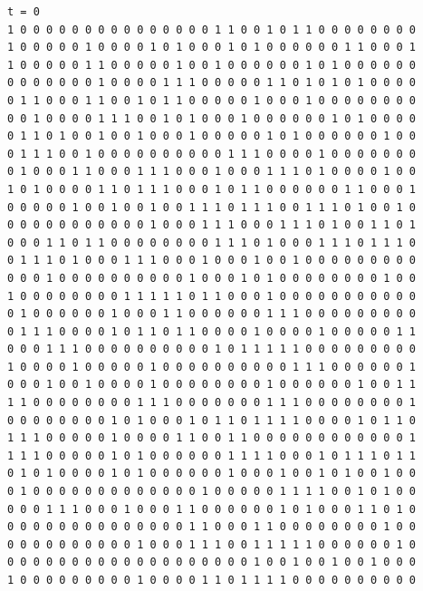 \documentclass[a4paper,12pt]{article}
\begin{document}
\begin{verbatim}
t = 0
1 0 0 0 0 0 0 0 0 0 0 0 0 0 0 0 1 1 0 0 1 0 1 1 0 0 0 0 0 0 0 0 
1 0 0 0 0 0 1 0 0 0 0 1 0 1 0 0 0 1 0 1 0 0 0 0 0 0 1 1 0 0 0 1 
1 0 0 0 0 0 1 1 0 0 0 0 0 1 0 0 1 0 0 0 0 0 0 1 0 1 0 0 0 0 0 0 
0 0 0 0 0 0 0 1 0 0 0 0 1 1 1 0 0 0 0 0 1 1 0 1 0 1 0 1 0 0 0 0 
0 1 1 0 0 0 1 1 0 0 1 0 1 1 0 0 0 0 0 1 0 0 0 1 0 0 0 0 0 0 0 0 
0 0 1 0 0 0 0 1 1 1 0 0 1 0 1 0 0 0 1 0 0 0 0 0 0 1 0 1 0 0 0 0 
0 1 1 0 1 0 0 1 0 0 1 0 0 0 1 0 0 0 0 0 1 0 1 0 0 0 0 0 0 1 0 0 
0 1 1 1 0 0 1 0 0 0 0 0 0 0 0 0 0 1 1 1 0 0 0 0 1 0 0 0 0 0 0 0 
0 1 0 0 0 1 1 0 0 0 1 1 1 0 0 0 1 0 0 0 1 1 1 0 1 0 0 0 0 1 0 0 
1 0 1 0 0 0 0 1 1 0 1 1 1 0 0 0 1 0 1 1 0 0 0 0 0 0 1 1 0 0 0 1 
0 0 0 0 0 1 0 0 1 0 0 1 0 0 1 1 1 0 1 1 1 0 0 1 1 1 0 1 0 0 1 0 
0 0 0 0 0 0 0 0 0 0 0 1 0 0 0 1 1 1 0 0 0 1 1 1 0 1 0 0 1 1 0 1 
0 0 0 1 1 0 1 1 0 0 0 0 0 0 0 0 1 1 1 0 1 0 0 0 1 1 1 0 1 1 1 0 
0 1 1 1 0 1 0 0 0 1 1 1 0 0 0 1 0 0 0 1 0 0 1 0 0 0 0 0 0 0 0 0 
0 0 0 1 0 0 0 0 0 0 0 0 0 0 1 0 0 0 1 0 1 0 0 0 0 0 0 0 0 1 0 0 
1 0 0 0 0 0 0 0 0 1 1 1 1 1 0 1 1 0 0 0 1 0 0 0 0 0 0 0 0 0 0 0 
0 1 0 0 0 0 0 0 1 0 0 0 1 1 0 0 0 0 0 0 1 1 1 0 0 0 0 0 0 0 0 0 
0 1 1 1 0 0 0 0 1 0 1 1 0 1 1 0 0 0 0 1 0 0 0 0 1 0 0 0 0 0 1 1 
0 0 0 1 1 1 0 0 0 0 0 0 0 0 0 0 1 0 1 1 1 1 1 0 0 0 0 0 0 0 0 0 
1 0 0 0 0 1 0 0 0 0 0 1 0 0 0 0 0 0 0 0 0 0 1 1 1 0 0 0 0 0 0 1 
0 0 0 1 0 0 1 0 0 0 0 1 0 0 0 0 0 0 0 0 1 0 0 0 0 0 0 1 0 0 1 1 
1 1 0 0 0 0 0 0 0 0 1 1 1 0 0 0 0 0 0 0 1 1 1 0 0 0 0 0 0 0 0 1 
0 0 0 0 0 0 0 0 1 0 1 0 0 0 1 0 1 1 0 1 1 1 1 0 0 0 0 1 0 1 1 0 
1 1 1 0 0 0 0 0 1 0 0 0 0 1 1 0 0 1 1 0 0 0 0 0 0 0 0 0 0 0 0 1 
1 1 1 0 0 0 0 0 1 0 1 0 0 0 0 0 0 1 1 1 1 0 0 0 1 0 1 1 1 0 1 1 
0 1 0 1 0 0 0 0 1 0 1 0 0 0 0 0 0 1 0 0 0 1 0 0 1 0 1 0 0 1 0 0 
0 1 0 0 0 0 0 0 0 0 0 0 0 0 0 1 0 0 0 0 0 1 1 1 1 0 0 1 0 1 0 0 
0 0 0 1 1 1 0 0 0 1 0 0 0 1 1 0 0 0 0 0 0 1 0 1 0 0 0 1 1 0 1 0 
0 0 0 0 0 0 0 0 0 0 0 0 0 0 1 1 0 0 0 1 1 0 0 0 0 0 0 0 0 1 0 0 
0 0 0 0 0 0 0 0 0 0 1 0 0 0 1 1 1 0 0 1 1 1 1 1 0 0 0 0 0 0 1 0 
0 0 0 0 0 0 0 0 0 0 0 0 0 0 0 0 0 0 0 1 0 0 1 0 0 1 0 0 1 0 0 0 
1 0 0 0 0 0 0 0 0 0 1 0 0 0 0 1 1 0 1 1 1 1 0 0 0 0 0 0 0 0 0 0 




\end{verbatim}
\end{document}
